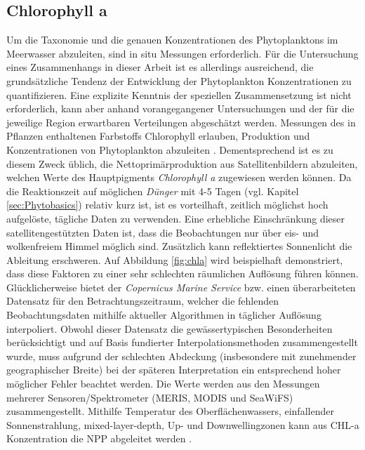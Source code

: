 \documentclass[12pt,a4paper,onecolumn,draft]{scrartcl}
\begin{document}
\subsection{Chlorophyll a} \label{sec:chla}
Um die Taxonomie und die genauen Konzentrationen des Phytoplanktons im Meerwasser abzuleiten, sind in situ Messungen erforderlich. Für die Untersuchung eines Zusammenhangs in dieser Arbeit ist es allerdings ausreichend, die grundsätzliche Tendenz der Entwicklung der Phytoplankton Konzentrationen zu quantifizieren. Eine explizite Kenntnis der speziellen Zusammensetzung ist nicht erforderlich, kann aber anhand vorangegangener Untersuchungen und der für die jeweilige Region erwartbaren Verteilungen abgeschätzt werden. Messungen des in Pflanzen enthaltenen Farbstoffs Chlorophyll erlauben, Produktion und Konzentrationen von Phytoplankton abzuleiten \citep{RYTHER.1957}. Dementsprechend ist es zu diesem Zweck üblich, die Nettoprimärproduktion aus Satellitenbildern abzuleiten, welchen Werte des Hauptpigments \textit{Chlorophyll a} zugewiesen werden können. Da die Reaktionszeit auf möglichen \textit{Dünger} mit 4-5 Tagen (vgl. Kapitel \ref{sec:Phytobasics}) relativ kurz ist, ist es vorteilhaft, zeitlich möglichst hoch aufgelöste, tägliche Daten zu verwenden. Eine erhebliche Einschränkung dieser satellitengestützten Daten ist, dass die Beobachtungen nur über eis- und wolkenfreiem Himmel möglich sind. Zusätzlich kann reflektiertes Sonnenlicht die Ableitung erschweren. Auf Abbildung \ref{fig:chla} wird beispielhaft demonstriert, dass diese Faktoren zu einer sehr schlechten räumlichen Auflösung führen können. Glücklicherweise bietet der \textit{Copernicus Marine Service} bzw. \citet{Saulquin.2019} einen überarbeiteten Datensatz für den Betrachtungszeitraum, welcher die fehlenden Beobachtungsdaten mithilfe aktueller Algorithmen in täglicher Auflösung interpoliert. Obwohl dieser Datensatz die gewässertypischen Besonderheiten berücksichtigt und auf Basis fundierter Interpolationsmethoden zusammengestellt wurde, muss aufgrund der schlechten Abdeckung (insbesondere mit zunehmender geographischer Breite) bei der späteren Interpretation ein entsprechend hoher möglicher Fehler beachtet werden. Die Werte werden  aus den Messungen mehrerer Sensoren/Spektrometer (MERIS, MODIS und SeaWiFS) zusammengestellt. Mithilfe Temperatur des Oberflächenwassers, einfallender Sonnenstrahlung, mixed-layer-depth, Up- und Downwellingzonen kann aus CHL-a Konzentration die NPP abgeleitet werden \citep{Falkowski.1998}.
\end{document}
